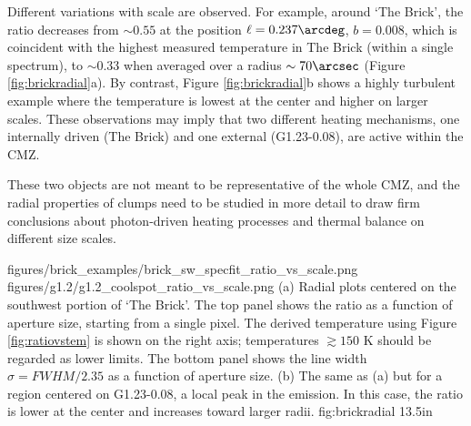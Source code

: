 Different variations with scale are observed.  For example, around `The Brick',
the ratio decreases from $\sim0.55$ at the position $\ell=0.237\arcdeg$,
$b=0.008$, which is coincident with the highest measured temperature in The
Brick (within a single spectrum), to $\sim0.33$ when averaged over a radius
$\sim70\arcsec$ (Figure \ref{fig:brickradial}a).  By contrast, Figure
\ref{fig:brickradial}b shows a highly turbulent example where the temperature
is lowest at the center and higher on larger scales.  
These observations may imply that two different heating mechanisms, one
internally driven (The Brick) and one external (G1.23-0.08), are active within
the CMZ.


These two objects are not meant to be representative of the whole CMZ, and the
radial properties of clumps need to be studied in more detail to draw firm
conclusions about photon-driven heating processes and thermal balance on
different size scales.  

\FigureTwo
{figures/brick_examples/brick_sw_specfit_ratio_vs_scale.png}
{figures/g1.2/g1.2_coolspot_ratio_vs_scale.png}
{ (a) Radial plots centered on the southwest portion of `The Brick'.
The top panel shows the ratio \Rone as a function of aperture size, starting
from a single pixel.
The derived temperature using Figure \ref{fig:ratiovstem} is shown on the right
axis; temperatures $\gtrsim150$ K should be regarded as lower limits.
The bottom panel shows the line width $\sigma = FWHM/2.35$
as a function of aperture size.  
(b) The same as (a) but for a region centered on G1.23-0.08, a local
peak in the \para \threeohthree emission.  In this case,
the ratio \Rone is lower at the center and increases toward larger radii.
}
{fig:brickradial}
{1}{3.5in}



